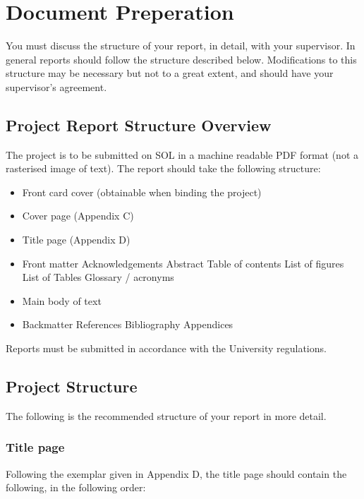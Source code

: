 \chapter{Document Preperation}

You must discuss the structure of your report, in detail, with your supervisor. In general reports should follow the structure described below. Modifications to this structure may be necessary but not to a great extent, and should have your supervisor’s agreement.

\section{Project Report Structure Overview}

The project is to be submitted on SOL in a machine readable PDF format (not a rasterised image of text). The report should take the following structure:

\begin{itemize}
    \item Front card cover (obtainable when binding the project)
    \item Cover page (Appendix C)
    \item Title page (Appendix D)
    \item Front matter
    \subitem Acknowledgements
    \subitem Abstract
    \subitem Table of contents
    \subitem List of figures
    \subitem List of Tables
    \subitem Glossary / acronyms
    \item Main body of text
    \item Backmatter
    \subitem References
    \subitem Bibliography
    \subitem Appendices  
\end{itemize}

Reports must be submitted in accordance with the University regulations.

\section{Project Structure}

The following is the recommended structure of your report in more detail.

\subsection{Title page}

Following the exemplar given in Appendix D, the title page should contain the following, in the following order:

